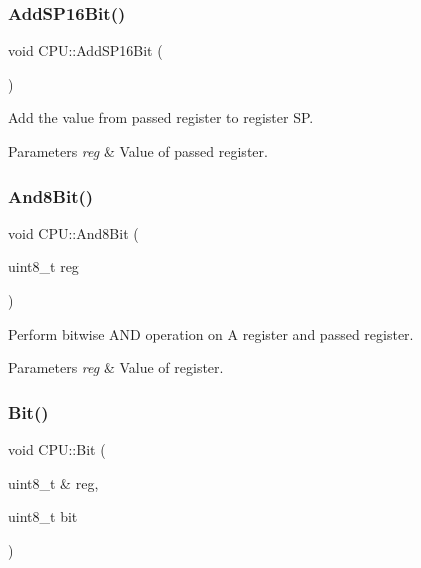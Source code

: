 \subsubsection{\texorpdfstring{Add\+S\+P16\+Bit()}{AddSP16Bit()}}
{\footnotesize\ttfamily void C\+P\+U\+::\+Add\+S\+P16\+Bit (\begin{DoxyParamCaption}{ }\end{DoxyParamCaption})\hspace{0.3cm}{\ttfamily [private]}}



Add the value from passed register to register SP. 


\begin{DoxyParams}{Parameters}
{\em reg} & Value of passed register. \\
\hline
\end{DoxyParams}
\mbox{\label{classCPU_a32632ab16ca2244110c9b732c3277851}} 
\subsubsection{\texorpdfstring{And8\+Bit()}{And8Bit()}}
{\footnotesize\ttfamily void C\+P\+U\+::\+And8\+Bit (\begin{DoxyParamCaption}\item[{uint8\+\_\+t}]{reg }\end{DoxyParamCaption})\hspace{0.3cm}{\ttfamily [private]}}



Perform bitwise A\+ND operation on A register and passed register. 


\begin{DoxyParams}{Parameters}
{\em reg} & Value of register. \\
\hline
\end{DoxyParams}
\mbox{\label{classCPU_ad260c5b0e5222059080f696f06b6085e}} 
\subsubsection{\texorpdfstring{Bit()}{Bit()}}
{\footnotesize\ttfamily void C\+P\+U\+::\+Bit (\begin{DoxyParamCaption}\item[{uint8\+\_\+t \&}]{reg,  }\item[{uint8\+\_\+t}]{bit }\end{DoxyParamCaption})\hspace{0.3cm}{\ttfamily [private]}}



